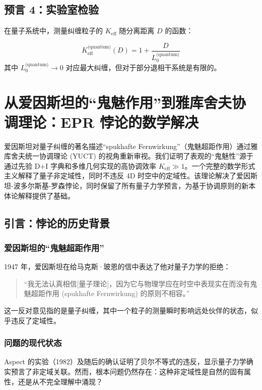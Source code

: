 \documentclass[11pt,a4paper]{article}
\begin{document}
	\subsection{预言 4：实验室检验}
	
	在量子系统中，测量纠缠粒子的 $K_{\mathrm{eff}}$ 随分离距离 $D$ 的函数：
	
	\begin{equation}
		K_{\mathrm{eff}}^{\text{(quantum)}}(D) = 1 + \frac{D}{L_0^{\text{(quantum)}}}
	\end{equation}
	其中 $L_0^{\text{(quantum)}} \to 0$ 对应最大纠缠，但对于部分退相干系统是有限的。
	
	\section{从爱因斯坦的“鬼魅作用”到雅库舍夫协调理论：EPR 悖论的数学解决}
	\label{sec:einstein-paradox}
	
	爱因斯坦对量子纠缠的著名描述“spukhafte Fernwirkung”（鬼魅超距作用）通过雅库舍夫统一协调理论 (YUCT) 的视角重新审视。我们证明了表观的“鬼魅性”源于通过先验 D+I 字典和多维几何实现的高协调效率 $K_{\mathrm{eff}} \gg 1$。一个完整的数学形式主义解释了量子非定域性，同时不违反 4D 时空中的定域性。该理论解决了爱因斯坦-波多尔斯基-罗森悖论，同时保留了所有量子力学预言，为基于协调原则的新本体论解释提供了基础。
	
	\subsection{引言：悖论的历史背景}
	\label{subsec:einstein-historical}
	
	\subsubsection{爱因斯坦的“鬼魅超距作用”}
	1947 年，爱因斯坦在给马克斯·玻恩的信中表达了他对量子力学的拒绝：
	
	\begin{quote}
		“我无法认真相信[量子理论]，因为它与物理学应在时空中表现实在而没有鬼魅超距作用 (spukhafte Fernwirkung) 的原则不相容。”
	\end{quote}
	
	这一反对意见指的是量子纠缠，其中一个粒子的测量瞬时影响远处伙伴的状态，似乎违反了定域性。
	
	\subsubsection{问题的现代状态}
	Aspect 的实验（1982）及随后的确认证明了贝尔不等式的违反，显示量子力学确实预言了非定域关联。然而，根本问题仍然存在：这种非定域性是自然的固有属性，还是从不完全理解中涌现？
	
\end{document}
